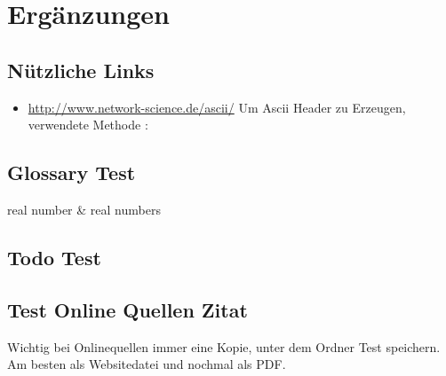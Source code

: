 %

\chapter{Ergänzungen}
	\section{Nützliche Links}
	\begin{itemize}
		\item \url{http://www.network-science.de/ascii/} Um Ascii Header zu Erzeugen, verwendete Methode : 
	\end{itemize}
	
	\section{Glossary Test}
	\gls{real number} \& \glspl{real number}
	
	\section{Todo Test}
	\lipsum[11]
	\lipsum[11]
	\lipsum[11]
	\lipsum[11]
	\lipsum[11]
	\lipsum[11]
	
	\section{Test Online Quellen Zitat}
	Wichtig bei Onlinequellen immer eine Kopie, unter dem Ordner Test  speichern. Am besten als Websitedatei und nochmal als PDF.\cite{qs.koeln}